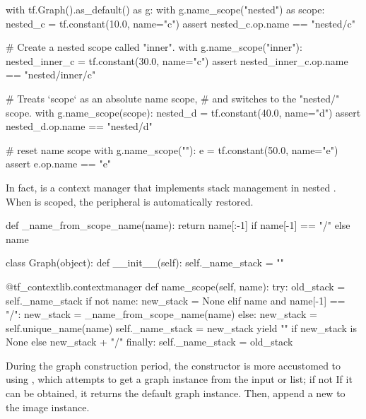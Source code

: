 \begin{content}
\begin{leftbar}
\begin{python}
with tf.Graph().as_default() as g:
  with g.name_scope("nested") as scope:
    nested_c = tf.constant(10.0, name="c")
    assert nested_c.op.name == "nested/c"

    # Create a nested scope called "inner".
    with g.name_scope("inner"):
      nested_inner_c = tf.constant(30.0, name="c")
      assert nested_inner_c.op.name == "nested/inner/c"

      # Treats `scope` as an absolute name scope, 
      # and switches to the "nested/" scope.
      with g.name_scope(scope):
        nested_d = tf.constant(40.0, name="d")
        assert nested_d.op.name == "nested/d"

        # reset name scope
        with g.name_scope(""):
          e = tf.constant(50.0, name="e")
          assert e.op.name == "e"
\end{python}
\end{leftbar}

In fact,  is a context manager that implements  stack management in nested . When  is scoped, the peripheral  is automatically restored.

\begin{leftbar}
\begin{python}
def _name_from_scope_name(name):
  return name[:-1] if name[-1] == "/" else name

class Graph(object):
  def __init__(self):
    self._name_stack = ""

  @tf_contextlib.contextmanager
  def name_scope(self, name):
    try:
      old_stack = self._name_stack
      if not name:
        new_stack = None
      elif name and name[-1] == "/":
        new_stack = _name_from_scope_name(name)
      else:
        new_stack = self.unique_name(name)
      self._name_stack = new_stack
      yield "" if new_stack is None else new_stack + "/"
    finally:
      self._name_stack = old_stack
\end{python}
\end{leftbar}

During the graph construction period, the  constructor is more accustomed to using , which attempts to get a graph instance from the input  or  list; if not If it can be obtained, it returns the default graph instance. Then, append a new  to the image instance.


\end{content}
